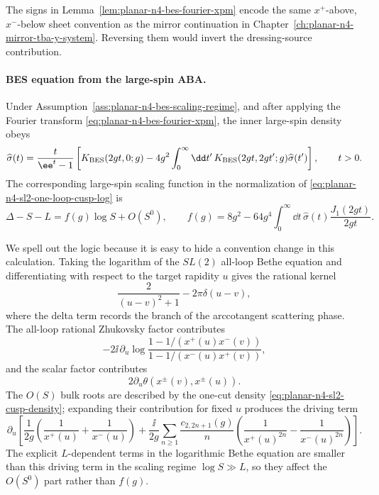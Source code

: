 The signs in Lemma~\ref{lem:planar-n4-bes-fourier-xpm} encode the same
\(x^+\)-above, \(x^-\)-below sheet convention as the mirror continuation in
Chapter~\ref{ch:planar-n4-mirror-tba-y-system}.  Reversing them would invert
the dressing-source contribution.

\paragraph{BES equation from the large-spin ABA.}
\label{par:planar-n4-bes-equation}
Under Assumption~\ref{ass:planar-n4-bes-scaling-regime}, and after applying
the Fourier transform \eqref{eq:planar-n4-bes-fourier-xpm}, the inner
large-spin density obeys
\begin{equation}
  \widehat\sigma(t)
  =
  \frac{t}{\ee^t-1}
  \left[
    K_{\rm BES}(2gt,0;g)
    -
    4g^2\int_0^\infty\dd t'\,
    K_{\rm BES}(2gt,2gt';g)\widehat\sigma(t')
  \right],
  \qquad t>0.
  \label{eq:planar-n4-bes-equation}
\end{equation}
The corresponding large-spin scaling function in the normalization of
\eqref{eq:planar-n4-sl2-one-loop-cusp-log} is
\begin{equation}
  \Delta-S-L=f(g)\log S+O(S^0),
  \qquad
  f(g)
  =
  8g^2
  -
  64g^4
  \int_0^\infty\dd t\,
  \widehat\sigma(t)\frac{J_1(2gt)}{2gt}.
  \label{eq:planar-n4-bes-scaling-function}
\end{equation}

We spell out the logic because it is easy to hide a convention change in this
calculation.  Taking the logarithm of the \(SL(2)\) all-loop Bethe equation
and differentiating with respect to the target rapidity \(u\) gives the
rational kernel
\[
  \frac{2}{(u-v)^2+1}-2\pi\delta(u-v),
\]
where the delta term records the branch of the arccotangent scattering phase.
The all-loop rational Zhukovsky factor contributes
\[
  -2\ii\,\partial_u\log
  \frac{1-1/(x^+(u)x^-(v))}
       {1-1/(x^-(u)x^+(v))},
\]
and the scalar factor contributes
\[
  2\partial_u\theta(x^\pm(v),x^\pm(u)).
\]
The \(O(S)\) bulk roots are described by the one-cut density
\eqref{eq:planar-n4-sl2-cusp-density}; expanding their contribution for
fixed \(u\) produces the driving term
\begin{equation}
  \partial_u\left[
  \frac1{2g}\left(\frac1{x^+(u)}+\frac1{x^-(u)}\right)
  +
  \frac{\ii}{2g}
  \sum_{n\geq1}\frac{c_{2,2n+1}(g)}{n}
  \left(\frac1{x^+(u)^{2n}}-\frac1{x^-(u)^{2n}}\right)
  \right].
  \label{eq:planar-n4-bes-inner-driving}
\end{equation}
The explicit \(L\)-dependent terms in the logarithmic Bethe equation are
smaller than this driving term in the scaling regime \(\log S\gg L\), so they
affect the \(O(S^0)\) part rather than \(f(g)\).

